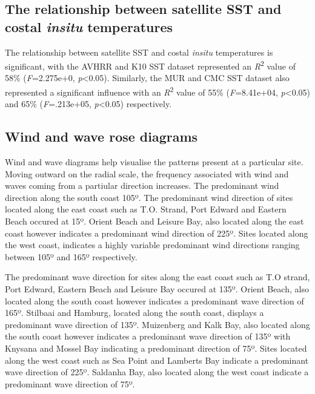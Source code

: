 \documentclass[10pt,a4paper,]{article}
\begin{document}
\hypertarget{the-relationship-between-satellite-sst-and-costal-insitu-temperatures}{%
\subsection{\texorpdfstring{The relationship between satellite SST and
costal \emph{insitu}
temperatures}{The relationship between satellite SST and costal insitu temperatures}}\label{the-relationship-between-satellite-sst-and-costal-insitu-temperatures}}

The relationship between satellite SST and costal \emph{insitu}
temperatures is significant, with the AVHRR and K10 SST dataset
represented an \emph{R}\textsuperscript{2} value of 58\%
(\emph{F}=2.275e+0, \emph{p}\textless{}0.05). Similarly, the MUR and CMC
SST dataset also represented a significant influence with an
\emph{R}\textsuperscript{2} value of 55\% (\emph{F}=8.41e+04,
\emph{p}\textless{}0.05) and 65\% (\emph{F}=.213e+05,
\emph{p}\textless{}0.05) respectively.

\hypertarget{wind-and-wave-rose-diagrams}{%
\subsection{Wind and wave rose
diagrams}\label{wind-and-wave-rose-diagrams}}

Wind and wave diagrams help visualise the patterns present at a
particular site. Moving outward on the radial scale, the frequency
associated with wind and waves coming from a partiular direction
increases. The predominant wind direction along the south coast 105º.
The predominant wind direction of sites located along the east coast
such as T.O. Strand, Port Edward and Eastern Beach occured at 15º.
Orient Beach and Leisure Bay, also located along the east coast however
indicates a predominant wind direction of 225º. Sites located along the
west coast, indicates a highly variable predominant wind directions
ranging between 105º and 165º respectively.

The predominant wave direction for sites along the east coast such as
T.O strand, Port Edward, Eastern Beach and Leisure Bay occured at 135º.
Orient Beach, also located along the south coast however indicates a
predominant wave direction of 165º. Stilbaai and Hamburg, located along
the south coast, displays a predominant wave direction of 135º.
Muizenberg and Kalk Bay, also located along the south coast however
indicates a predominant wave direction of 135º with Knysana and Mossel
Bay indicating a predominant direction of 75º. Sites located along the
west coast such as Sea Point and Lamberts Bay indicate a predominant
wave direction of 225º. Saldanha Bay, also located along the west coast
indicate a predominant wave direction of 75º.
\end{document}
